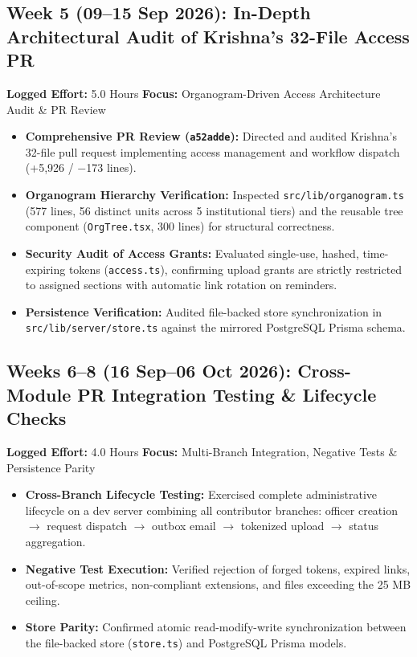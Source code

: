 \documentclass[11pt,a4paper]{article}
\begin{document}
\subsection*{Week 5 (09--15 Sep 2026): In-Depth Architectural Audit of Krishna's 32-File Access PR}
\textbf{Logged Effort:} 5.0 Hours \quad \textbf{Focus:} Organogram-Driven Access Architecture Audit \& PR Review
\begin{itemize}[leftmargin=1.4em, itemsep=2pt]
\item \textbf{Comprehensive PR Review (\texttt{a52adde}):} Directed and audited Krishna's 32-file pull request implementing access management and workflow dispatch (+5,926 / $-$173 lines).
\item \textbf{Organogram Hierarchy Verification:} Inspected \texttt{src/lib/organogram.ts} (577 lines, 56 distinct units across 5 institutional tiers) and the reusable tree component (\texttt{OrgTree.tsx}, 300 lines) for structural correctness.
\item \textbf{Security Audit of Access Grants:} Evaluated single-use, hashed, time-expiring tokens (\texttt{access.ts}), confirming upload grants are strictly restricted to assigned sections with automatic link rotation on reminders.
\item \textbf{Persistence Verification:} Audited file-backed store synchronization in \texttt{src/lib/server/store.ts} against the mirrored PostgreSQL Prisma schema.
\end{itemize}

\subsection*{Weeks 6--8 (16 Sep--06 Oct 2026): Cross-Module PR Integration Testing \& Lifecycle Checks}
\textbf{Logged Effort:} 4.0 Hours \quad \textbf{Focus:} Multi-Branch Integration, Negative Tests \& Persistence Parity
\begin{itemize}[leftmargin=1.4em, itemsep=2pt]
\item \textbf{Cross-Branch Lifecycle Testing:} Exercised complete administrative lifecycle on a dev server combining all contributor branches: officer creation $\rightarrow$ request dispatch $\rightarrow$ outbox email $\rightarrow$ tokenized upload $\rightarrow$ status aggregation.
\item \textbf{Negative Test Execution:} Verified rejection of forged tokens, expired links, out-of-scope metrics, non-compliant extensions, and files exceeding the 25 MB ceiling.
\item \textbf{Store Parity:} Confirmed atomic read-modify-write synchronization between the file-backed store (\texttt{store.ts}) and PostgreSQL Prisma models.
\end{itemize}
\end{document}
